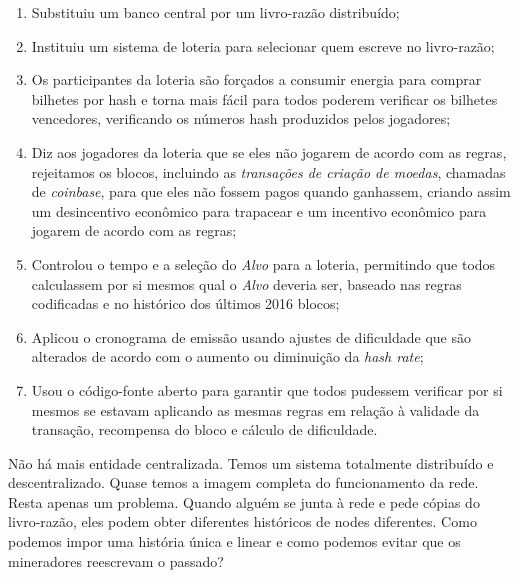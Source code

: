 \begin{enumerate}
\item Substituiu um banco central por um livro-razão distribuído;
\item Instituiu um sistema de loteria para selecionar quem escreve no livro-razão;
\item Os participantes da loteria são forçados a consumir energia para comprar bilhetes por hash e torna mais fácil para todos poderem verificar os bilhetes vencedores, verificando os números hash produzidos pelos jogadores;
\item Diz aos jogadores da loteria que se eles não jogarem de acordo com as regras, rejeitamos os blocos, incluindo as \textit{transações de criação de moedas}, chamadas de \textit{coinbase}, para que eles não fossem pagos quando ganhassem, criando assim um desincentivo econômico para trapacear e um incentivo econômico para jogarem de acordo com as regras;
\item Controlou o tempo e a seleção do \textit{Alvo} para a loteria, permitindo que todos calculassem por si mesmos qual o \textit{Alvo} deveria ser, baseado nas regras codificadas e no histórico dos últimos 2016 blocos;
\item Aplicou o cronograma de emissão usando ajustes de dificuldade que são alterados de acordo com o aumento ou diminuição da \textit{hash rate};
\item Usou o código-fonte aberto para garantir que todos pudessem verificar por si mesmos se estavam aplicando as mesmas regras em relação à validade da transação, recompensa do bloco e cálculo de dificuldade.
\end{enumerate}

 
Não há mais entidade centralizada. Temos um sistema totalmente distribuído e descentralizado.
Quase temos a imagem completa do funcionamento da rede. Resta apenas um problema. Quando alguém se junta à rede e pede cópias do livro-razão, eles podem obter diferentes históricos de nodes diferentes. Como podemos impor uma história única e linear e como podemos evitar que os mineradores reescrevam o passado?



